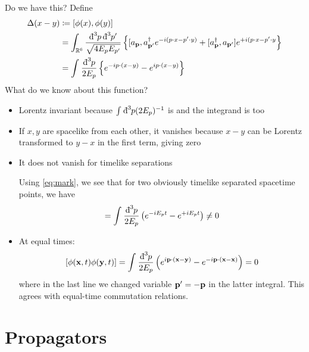 Do we have this? Define
\begin{align}
  \Delta(x - y) &\coloneqq [\phi(x), \phi(y)] \\
		&= \int_{\mathbb{R}^6}^{} \frac{\bdd[3]{p} \bdd[3]{p'}}{\sqrt{4 E_p E_{p'}}} \left\{ [a_{\vb{p}}, a^{\dagger}_{\vb{p}'} e^{-i (p \cdot x - p' \cdot y)} + [a^{\dagger}_{\vb{p}}, a_{\vb{p}'} ] e^{+i (p \cdot x - p' \cdot y} \right\} \\
		&= \int_{}^{} \frac{\bdd[3]{p}}{2E_p} \left\{ e^{-i p \cdot (x - y)} - e^{i p \cdot (x - y)} \right\} \label{eq:mark}
\end{align}
What do we know about this function?
\begin{itemize}
  \item Lorentz invariant because $\int_{}^{} \bdd[3]{p} (2 E_p)^{-1}$ is and the integrand is too
  \item If $x, y$ are spacelike from each other, it vanishes because $x - y$ can be Lorentz transformed to $y - x$ in the first term, giving zero
  \item It does not vanish for timelike separations
    \begin{example}[]
      Using \eqref{eq:mark}, we see that for two obviously timelike separated spacetime points, we have
      \begin{equation}
	[\phi (\vb{x}, 0), \phi(\vb{x} , t) ] = \int_{}^{} \frac{\bdd[3]{p} }{2E_p} \left( e^{-i E_p t} - e^{+i E_p t} \right) \neq 0
      \end{equation}
    \end{example}
  \item At equal times:
    \begin{equation}
      \label{eq:mark2}
      [\phi(\vb{x}, t) \phi(\vb{y}, t) ] = \int_{}^{} \frac{\bdd[3]{p}}{2E_p} \left( e^{i \vb{p} \cdot (\vb{x} - \vb{y})} - e^{-i \vb{p} \cdot (\vb{x} - \vb{x})}\right) = 0
    \end{equation}
    where in the last line we changed variable $\vb{p}' = -\vb{p}$ in the latter integral.
    This agrees with equal-time commutation relations.
\end{itemize}

\section{Propagators}%
\label{sec:propagators}

